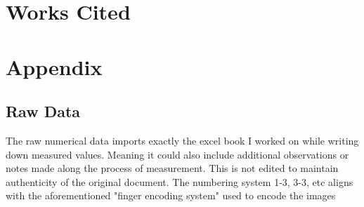 \documentclass[12pt]{article}
\begin{document}
\section{Works Cited}
    
\printbibliography
    
\section{Appendix}
\subsection{Raw Data}
The raw numerical data imports exactly the excel book I worked on while writing down measured values. Meaning it could also include additional observations or notes made along the process of measurement. This is not edited to maintain authenticity of the original document. The numbering system 1-3, 3-3, etc aligns with the aforementioned "finger encoding system" used to encode the images
\end{document}
